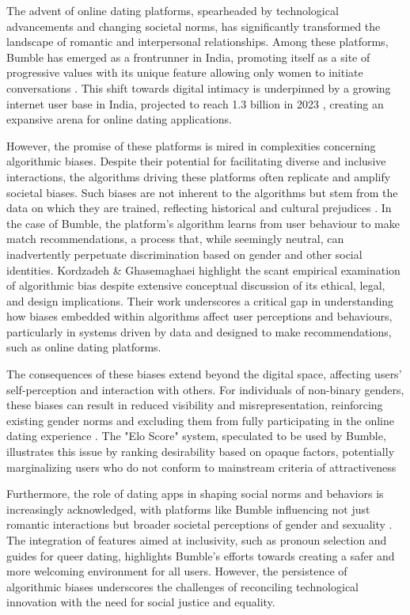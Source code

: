 The advent of online dating platforms, spearheaded by technological advancements and changing societal norms, has significantly transformed the landscape of romantic and interpersonal relationships. Among these platforms, Bumble has emerged as a frontrunner in India, promoting itself as a site of progressive values with its unique feature allowing only women to initiate conversations \cite{noauthor_bumble_nodate}. This shift towards digital intimacy is underpinned by a growing internet user base in India, projected to reach 1.3 billion in 2023 \cite{noauthor_india_nodate},  creating an expansive arena for online dating applications.

However, the promise of these platforms is mired in complexities concerning algorithmic biases. Despite their potential for facilitating diverse and inclusive interactions, the algorithms driving these platforms often replicate and amplify societal biases. Such biases are not inherent to the algorithms but stem from the data on which they are trained, reflecting historical and cultural prejudices \cite{davidson-etal-2019-racial, Raghavan_Barocas_Kleinberg_Levy_2019}. In the case of Bumble, the platform's algorithm learns from user behaviour to make match recommendations, a process that, while seemingly neutral, can inadvertently perpetuate discrimination based on gender and other social identities. Kordzadeh \& Ghasemaghaei highlight the scant empirical examination of algorithmic bias despite extensive conceptual discussion of its ethical, legal, and design implications. Their work underscores a critical gap in understanding how biases embedded within algorithms affect user perceptions and behaviours, particularly in systems driven by data and designed to make recommendations, such as online dating platforms.

The consequences of these biases extend beyond the digital space, affecting users' self-perception and interaction with others. For individuals of non-binary genders, these biases can result in reduced visibility and misrepresentation, reinforcing existing gender norms and excluding them from fully participating in the online dating experience \cite{Bivens_Hoque_2018, MacLeod_McArthur_2019}. The "Elo Score" system, speculated to be used by Bumble, illustrates this issue by ranking desirability based on opaque factors, potentially marginalizing users who do not conform to mainstream criteria of attractiveness \cite{Carr_2016}

Furthermore, the role of dating apps in shaping social norms and behaviors is increasingly acknowledged, with platforms like Bumble influencing not just romantic interactions but broader societal perceptions of gender and sexuality \cite{Das_2019, Forbes_2020}. The integration of features aimed at inclusivity, such as pronoun selection and guides for queer dating, highlights Bumble's efforts towards creating a safer and more welcoming environment for all users. However, the persistence of algorithmic biases underscores the challenges of reconciling technological innovation with the need for social justice and equality.

